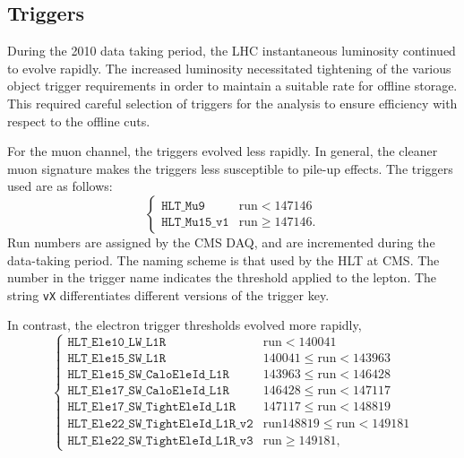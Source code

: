 \subsection{Triggers}
\label{sec:wpol_triggers}
During the 2010 data taking period, the \ac{LHC} instantaneous luminosity
continued to evolve rapidly. The increased luminosity necessitated tightening of
the various object trigger requirements in order to maintain a suitable rate for
offline storage. This required careful selection of triggers for the analysis to
ensure efficiency with respect to the offline cuts.

For the muon channel, the triggers evolved less rapidly. In general, the cleaner
muon signature makes the triggers less susceptible to pile-up effects. The
triggers used are as follows:
\begin{equation*}
\begin{cases}
\texttt{HLT\_Mu9}          & \textrm{run} < 147146 \\
\texttt{HLT\_Mu15\_v1} & \textrm{run} \geq 147146.
\end{cases}
\end{equation*}
Run numbers are assigned by the \ac{CMS} \ac{DAQ}, and are incremented during
the data-taking period. The naming scheme is that used by the \ac{HLT} at
\ac{CMS}. The number in the trigger name indicates the \Pt threshold applied to
the lepton. The string \texttt{vX} differentiates different versions of the
trigger key.

In contrast, the electron trigger thresholds evolved more rapidly,
\begin{equation*}
\begin{cases}
  \texttt{HLT\_Ele10\_LW\_L1R} & \textrm{run} < 140041 \\
  \texttt{HLT\_Ele15\_SW\_L1R} & 140041 \leq \textrm{run} < 143963 \\
  \texttt{HLT\_Ele15\_SW\_CaloEleId\_L1R} & 143963 \leq \textrm{run} < 146428 \\
  \texttt{HLT\_Ele17\_SW\_CaloEleId\_L1R} & 146428 \leq \textrm{run} < 147117 \\
  \texttt{HLT\_Ele17\_SW\_TightEleId\_L1R} & 147117 \leq \textrm{run} < 148819 \\
  \texttt{HLT\_Ele22\_SW\_TightEleId\_L1R\_v2} & \textrm{run} 148819 \leq \textrm{run} < 149181 \\
  \texttt{HLT\_Ele22\_SW\_TightEleId\_L1R\_v3} & \textrm{run} \geq 149181,
\end{cases}
\end{equation*}

